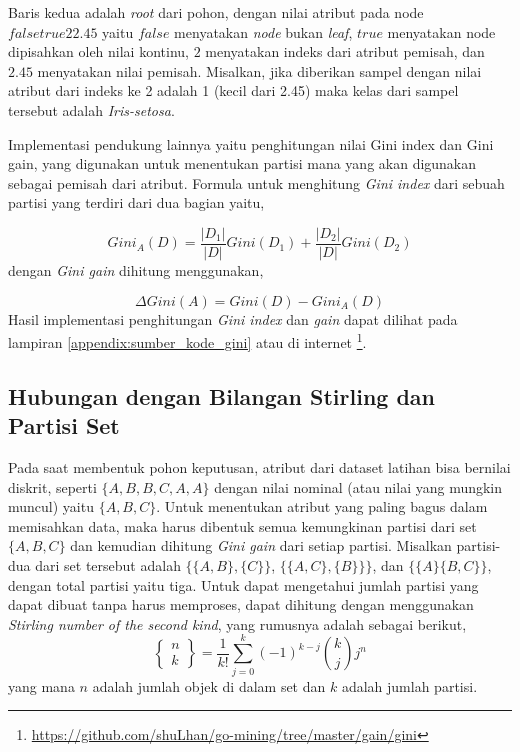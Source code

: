 Baris kedua adalah \textit{root} dari pohon, dengan nilai atribut pada node $ { false true 2 2.45 } $ yaitu $false$ menyatakan \textit{node} bukan \textit{leaf}, $true$ menyatakan node dipisahkan oleh nilai kontinu, $2$ menyatakan indeks dari atribut pemisah, dan $2.45$ menyatakan nilai pemisah. Misalkan, jika diberikan sampel dengan nilai atribut dari indeks ke 2 adalah 1 (kecil dari 2.45) maka kelas dari sampel tersebut adalah \textit{Iris-setosa}.

Implementasi pendukung lainnya yaitu penghitungan nilai Gini index dan Gini gain, yang digunakan untuk menentukan partisi mana yang akan digunakan sebagai pemisah dari atribut.
Formula untuk menghitung \textit{Gini index} dari sebuah partisi yang terdiri dari dua bagian yaitu,

\begin{equation*}
Gini_{A}(D) = \frac{|D_{1}|}{|D|} Gini(D_{1}) + \frac{|D_{2}|}{|D|} Gini(D_{2})
\end{equation*}%
%
dengan \textit{Gini gain} dihitung menggunakan,

\begin{equation*}
	\Delta Gini(A) = Gini(D) - Gini_{A}(D)
\end{equation*}%
%
Hasil implementasi penghitungan \textit{Gini index} dan \textit{gain} dapat dilihat pada lampiran \ref{appendix:sumber_kode_gini} atau di internet \footnote{\url{https://github.com/shuLhan/go-mining/tree/master/gain/gini}}.

\subsection{Hubungan dengan Bilangan Stirling dan Partisi Set}

Pada saat membentuk pohon keputusan, atribut dari dataset latihan bisa bernilai diskrit, seperti $ \{A,B,B,C,A,A\} $ dengan nilai nominal (atau nilai yang mungkin muncul) yaitu $ \{A,B,C\} $. Untuk menentukan atribut yang paling bagus dalam memisahkan data, maka harus dibentuk semua kemungkinan partisi dari set $ \{A,B,C\} $ dan kemudian dihitung \textit{Gini gain} dari setiap partisi.
Misalkan partisi-dua dari set tersebut adalah $ \{\{A,B\},\{C\}\} $, $ \{\{A,C\},\{B\}\}\} $, dan $\{\{A\}\{B,C\}\}$, dengan total partisi yaitu tiga. Untuk dapat mengetahui jumlah partisi yang dapat dibuat tanpa harus memproses, dapat dihitung dengan menggunakan \textit{Stirling number of the second kind}, yang rumusnya adalah sebagai berikut,%
%
\begin{equation*}
	\begin{Bmatrix}
		n \\
		k
	\end{Bmatrix} = \frac{1}{k!} \sum_{j=0}^{k} (-1)^{k-j} \binom{k}{j} j^{n}
\end{equation*}%
%
yang mana $n$ adalah jumlah objek di dalam set dan $k$ adalah jumlah partisi.

